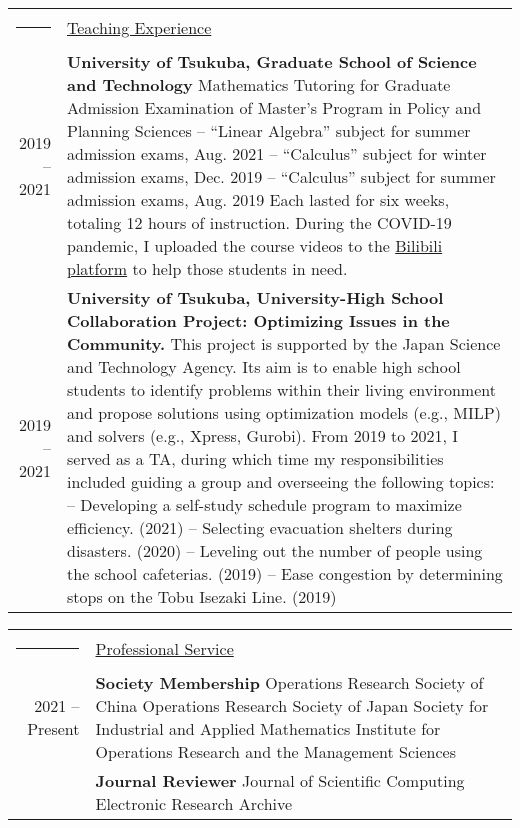 \documentclass[a4paper,10pt]{article}
\newcommand{\headingfont}{\LARGE \MakeUppercase }
\newenvironment{SectionTable}[1]{
	\renewcommand*{\arraystretch}{1.0}
	\setlength{\tabcolsep}{10pt}
	\begin{longtable}{Rp{5.2in}} 
		\rule{2.3cm}{4pt} 
		& \underline{#1} \\ %
	}
	{
	\end{longtable}\vspace{-.3cm}
}
\begin{document}
\begin{SectionTable}{\headingfont Teaching Experience}
	2019 -- 2021 &
	\textbf{University of Tsukuba, Graduate School of Science and Technology} \newline
	Mathematics Tutoring for Graduate Admission Examination of Master's Program in Policy and Planning Sciences \newline
	-- ``Linear Algebra'' subject for summer admission exams, Aug. 2021  \newline
	-- ``Calculus'' subject for winter admission exams, Dec. 2019 \newline
	-- ``Calculus'' subject for summer admission exams, Aug. 2019 \newline
	Each lasted for six weeks, totaling 12 hours of instruction. During the COVID-19 pandemic, I uploaded the course videos to the \href{https://space.bilibili.com/16115578}{Bilibili platform} to help those students in need. \\
	 
	 2019 -- 2021 &
	 \textbf{University of Tsukuba, University-High School Collaboration Project: Optimizing Issues in the Community.} \newline	
	This project is supported by the Japan Science and Technology Agency. Its aim is to enable high school students to identify problems within their living environment and propose solutions using optimization models (e.g., MILP) and solvers (e.g., Xpress, Gurobi). \newline	
	From 2019 to 2021, I served as a TA, during which time my responsibilities included guiding a group and overseeing the following topics: \newline
	--  {Developing a self-study schedule program to maximize efficiency}. (2021) \newline
	--  {Selecting evacuation shelters during disasters}. (2020) \newline 
	--  {Leveling out the number of people using the school cafeterias}. (2019) \newline
	--  {Ease congestion by determining stops on the Tobu Isezaki Line}. (2019) 
\end{SectionTable}

\begin{SectionTable}{\headingfont Professional Service}
	2021 -- Present & 
	\textbf{Society Membership} \newline
	Operations Research Society of China \newline
	Operations Research Society of Japan \newline
	Society for Industrial and Applied Mathematics \newline
	Institute for Operations Research and the Management Sciences \\
	
	& \textbf{Journal Reviewer} \newline
	Journal of Scientific Computing \newline
	Electronic Research Archive
\end{SectionTable}
\end{document}
